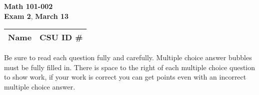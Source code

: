 \documentclass[12pt]{exam}
\newcommand{\class}{Math 101-002} %
\newcommand{\examnum}{Exam 2} %
\newcommand{\examdate}{March 13} %
\begin{document}
\pagestyle{plain}
\thispagestyle{empty}

\noindent
\textbf{\class}\\
\textbf{\examnum}, \textbf{\examdate} \\



\setlength{\tabcolsep}{3.5cm} %
\renewcommand{\arraystretch}{1.5}
\setlength\extrarowheight{1cm}
\begin{tabular}{ |c|c| } 
 \hline
 Name   & CSU ID \#  \\ 
 \hline
\end{tabular}
\vspace{10pt}

Be sure to read each question fully and carefully. Multiple choice answer bubbles must be fully filled in.  There is space to the right of each multiple choice question to show work, if your work is correct you can get points even with an incorrect multiple choice answer.  


\iffalse

    \foreach \s in {1,...,5}{
          \choice $P_\s$ has no power 
     }%
\fi
\end{document}
